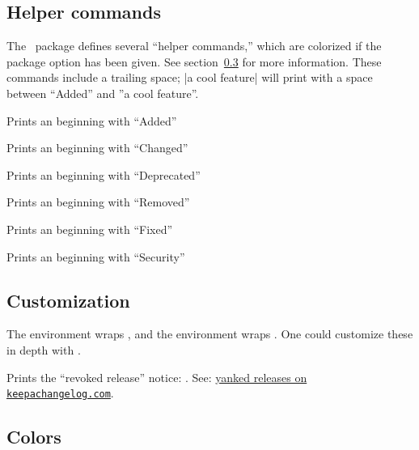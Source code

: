\documentclass{ltxdoc}
\begin{document}
\subsection{Helper commands}

The \cl\ package defines several ``helper commands,'' which are colorized if
the  package option has been given. See
section~\ref{sec:colors} for more information. These commands include a
trailing space; |\added a cool feature| will print with a space between
``Added'' and ''a cool feature''.

\begin{macro}{\added}Prints an  beginning with ``Added''\end{macro}
\begin{macro}{\changed}Prints an  beginning with ``Changed''\end{macro}
\begin{macro}{\deprecated}Prints an  beginning with ``Deprecated''\end{macro}
\begin{macro}{\removed}Prints an  beginning with ``Removed''\end{macro}
\begin{macro}{\fixed}Prints an  beginning with ``Fixed''\end{macro}
\begin{macro}{\security}Prints an  beginning with ``Security''\end{macro}

\subsection{Customization}

The  environment wraps , and the
 environment wraps . One could customize these in
depth with .

\begin{macro}{\changelogyanked} Prints the ``revoked release'' notice:
\changelogyanked. See:
\href{https://keepachangelog.com/en/1.0.0/#yanked}{yanked releases on
\texttt{keepachangelog.com}}.

\end{macro}

\subsection{Colors}%
\label{sec:colors}
\end{document}
